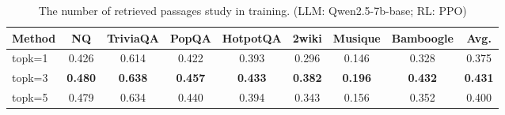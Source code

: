 
\begin{table}[h]
    \centering
    \scriptsize
    \setlength{\tabcolsep}{3pt}
    \renewcommand{\arraystretch}{1.2}
    \caption{The number of retrieved passages study in \Ours training. (LLM: Qwen2.5-7b-base; RL: PPO)}\label{tab:apx:topk}
    \begin{tabular}{lcccccccc}
        \toprule
        \textbf{Method} & \textbf{NQ} & \textbf{TriviaQA} & \textbf{PopQA} & \textbf{HotpotQA} & \textbf{2wiki} & \textbf{Musique} & \textbf{Bamboogle} & \textbf{Avg.} \\
        \midrule
        topk=1 & 0.426 & 0.614 & 0.422 & 0.393 & 0.296 & 0.146 & 0.328 & 0.375 \\
        topk=3 & \textbf{0.480} & \textbf{0.638} & \textbf{0.457}	& \textbf{0.433} & \textbf{0.382} & \textbf{0.196} & \textbf{0.432} & \textbf{0.431}  \\
        topk=5 & 0.479 & 0.634 & 0.440 & 0.394 & 0.343 & 0.156 & 0.352 & 0.400 \\
        \bottomrule
    \end{tabular}
\end{table}
